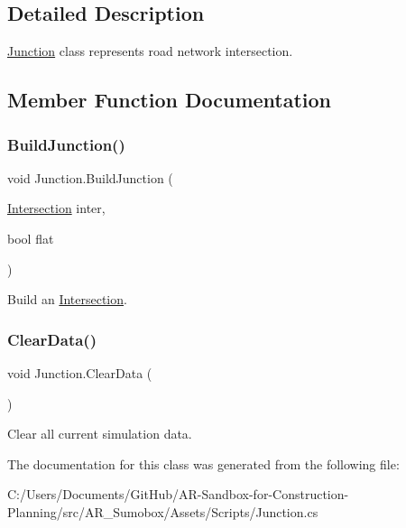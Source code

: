 \subsection{Detailed Description}
\mbox{\hyperlink{class_junction}{Junction}} class represents road network intersection. 



\subsection{Member Function Documentation}
\mbox{\label{class_junction_ac628e043d2e35c8323d819f26dc3e0f8}} 
\subsubsection{\texorpdfstring{BuildJunction()}{BuildJunction()}}
{\footnotesize\ttfamily void Junction.\+Build\+Junction (\begin{DoxyParamCaption}\item[{\mbox{\hyperlink{struct_intersection}{Intersection}}}]{inter,  }\item[{bool}]{flat }\end{DoxyParamCaption})}



Build an \mbox{\hyperlink{struct_intersection}{Intersection}}. 

\mbox{\label{class_junction_a57e3c911fbcf14d45b861fcce0d717aa}} 
\subsubsection{\texorpdfstring{ClearData()}{ClearData()}}
{\footnotesize\ttfamily void Junction.\+Clear\+Data (\begin{DoxyParamCaption}{ }\end{DoxyParamCaption})}



Clear all current simulation data. 



The documentation for this class was generated from the following file\+:\begin{DoxyCompactItemize}
\item 
C\+:/\+Users/\+Documents/\+Git\+Hub/\+A\+R-\/\+Sandbox-\/for-\/\+Construction-\/\+Planning/src/\+A\+R\+\_\+\+Sumobox/\+Assets/\+Scripts/Junction.\+cs\end{DoxyCompactItemize}
